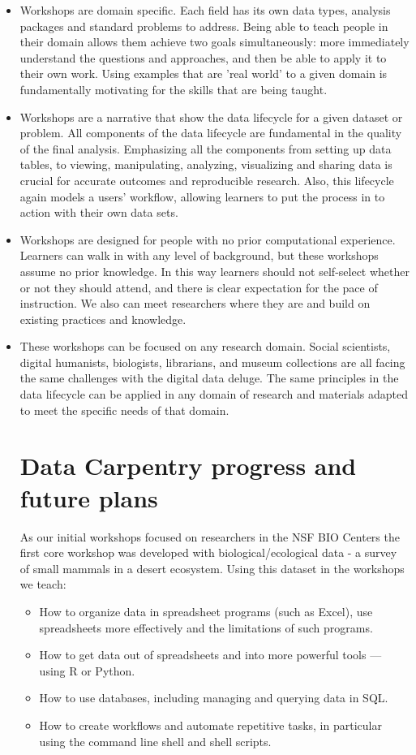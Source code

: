 \documentclass[15]{idcc}
\begin{document}
\begin{itemize}
\item Workshops are domain specific. Each field has its own data types, analysis packages and standard problems to address.
Being able to teach people in their domain allows them achieve two goals simultaneously:  more immediately understand the questions and approaches, and then
be able to apply it to their own work. Using examples that are 'real world' to a given domain is fundamentally motivating for
the skills that are being taught.

\item Workshops are a narrative that show the data lifecycle for a given dataset or problem. All components of the data lifecycle
are fundamental in the quality of the final analysis. Emphasizing all the components from setting up data tables, to viewing,
manipulating, analyzing, visualizing and sharing data is crucial for accurate outcomes and reproducible research. Also, this
lifecycle again models a users' workflow, allowing learners to put the process in to action with their own data sets.

\item Workshops are designed for people with no prior computational experience. Learners can walk in with any level of background,
but these workshops assume no prior knowledge. In this way learners should not self-select whether or not they should attend, and
there is clear expectation for the pace of instruction. We also can meet researchers where they are and build on existing practices
and knowledge.

\item These workshops can be focused on any research domain. Social scientists, digital humanists, biologists, librarians,
and museum collections are all facing the same challenges with the digital data deluge. The same principles in the data lifecycle
can be applied in any domain of research and materials adapted to meet the specific needs of that domain.

\section{Data Carpentry progress and future plans}

As our initial workshops focused on researchers in the NSF BIO Centers the first core workshop was developed with
biological/ecological data - a survey of small mammals in a desert ecosystem. Using this dataset in the workshops we teach:
\begin{itemize}
\item How to organize data in spreadsheet programs (such as Excel), use spreadsheets more effectively and the limitations of such programs.
\item How to get data out of spreadsheets and into more powerful tools --- using R or Python.
\item How to use databases, including managing and querying data in SQL.
\item How to create workflows and automate repetitive tasks, in particular using the command line shell and shell scripts.
\end{itemize}


\end{itemize}
\end{document}

